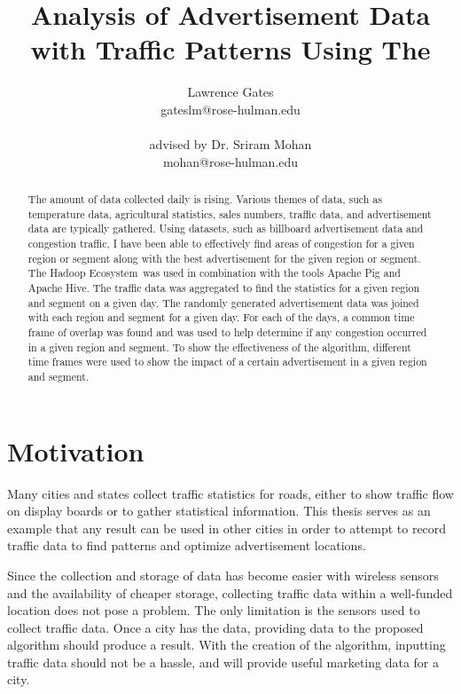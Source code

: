 \documentclass[titlepage,twocolumn]{article}
\title{Analysis of Advertisement Data with Traffic Patterns Using The \HadoopEcosystem}
\author{Lawrence Gates \\ 
	{gateslm@rose-hulman.edu} \\ \\
	advised by Dr. Sriram Mohan \\ {mohan@rose-hulman.edu}
}
\newcommand{\HadoopEcosystem}{Hadoop Ecosystem}
\begin{document}
\maketitle
\onecolumn
\tableofcontents
\twocolumn

\begin{abstract}
	The amount of data collected daily is rising. Various themes of data, such as temperature data, agricultural statistics, sales numbers, traffic data, and advertisement data are typically gathered. Using datasets, such as billboard advertisement data and congestion traffic, I have been able to effectively find areas of congestion for a given region or segment along with the best advertisement for the given region or segment. The \HadoopEcosystem\ was used in combination with the tools Apache Pig and Apache Hive. The traffic data was aggregated to find the statistics for a given region and segment on a given day. The randomly generated advertisement data was joined with each region and segment for a given day. For each of the days, a common time frame of overlap was found and was used to help determine if any congestion occurred in a given region and segment. To show the effectiveness of the algorithm, different time frames were used to show the impact of a certain advertisement in a given region and segment. 
\end{abstract}

\section{Motivation}

\par Many cities and states collect traffic statistics for roads, either to show traffic flow on display boards or to gather statistical information. This thesis serves as an example that any result can be used in other cities in order to attempt to record traffic data to find patterns and optimize advertisement locations. 
\par
Since the collection and storage of data has become easier with wireless sensors and the availability of cheaper storage, collecting traffic data within a well-funded location does not pose a problem. The only limitation is the sensors used to collect traffic data. Once a city has the data, providing data to the proposed algorithm should produce a result. With the creation of the algorithm, inputting traffic data should not be a hassle, and will provide useful marketing data for a city. 
\end{document}
